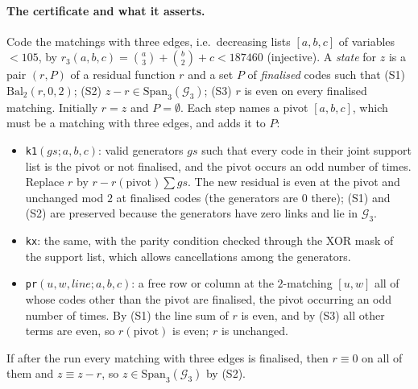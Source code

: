 \paragraph{The certificate and what it asserts.}
Code the matchings with three edges, i.e.\ decreasing lists $[a,b,c]$ of variables
$<105$, by $r_3(a,b,c)=\binom a3+\binom b2+c<187460$ (injective).
A \emph{state} for $z$ is a pair $(r,P)$ of a residual function $r$ and a set $P$ of
\emph{finalised} codes such that
(S1) $\mathrm{Bal}_2(r,0,2)$; (S2) $z-r\in\mathrm{Span}_3(\mathcal G_3)$; (S3) $r$ is
even on every finalised matching.
Initially $r=z$ and $P=\emptyset$.  Each step names a
pivot $[a,b,c]$, which must be a matching with three edges, and adds it to $P$:
\begin{itemize}
\item \texttt{k1}$(\mathit{gs};a,b,c)$: valid generators $\mathit{gs}$ such that every
code in their joint support list is the pivot or not finalised, and the pivot occurs
an odd number of times.  Replace $r$ by $r-r(\text{pivot})\sum\mathit{gs}$.  The new
residual is even at the pivot and unchanged mod $2$ at finalised codes (the
generators are $0$ there); (S1) and (S2) are preserved because the generators have
zero links and lie in $\mathcal G_3$.
\item \texttt{kx}: the same, with the parity condition checked through the XOR mask
of the support list, which allows cancellations among the
generators.
\item \texttt{pr}$(u,w,\mathit{line};a,b,c)$: a free row or column at the
$2$-matching $[u,w]$ all of whose codes other than the pivot are finalised, the
pivot occurring an odd number of times.  By (S1) the line sum of $r$ is even, and
by (S3) all other terms are even, so $r(\text{pivot})$ is even; $r$ is
unchanged.
\end{itemize}
If after the run every matching with three edges is finalised, then $r\equiv0$ on all
of them and $z\equiv z-r$, so $z\in\mathrm{Span}_3(\mathcal G_3)$ by
(S2).

